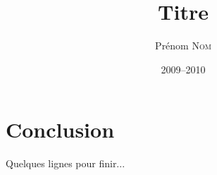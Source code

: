 \documentclass[12pt,a4paper]{memoire-umons}
\title{Titre}
\author{Prénom \textsc{Nom}}
\date{2009--2010}
\begin{document}
\tableofcontents







\chapter*{Conclusion}

Quelques lignes pour finir...


\end{document}
